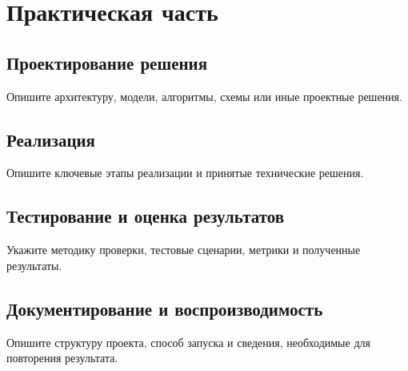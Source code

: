 \chapter{Практическая часть}

\section{Проектирование решения}
Опишите архитектуру, модели, алгоритмы, схемы или иные проектные решения.

\section{Реализация}
Опишите ключевые этапы реализации и принятые технические решения.

\section{Тестирование и оценка результатов}
Укажите методику проверки, тестовые сценарии, метрики и полученные результаты.

\section{Документирование и воспроизводимость}
Опишите структуру проекта, способ запуска и сведения, необходимые для повторения результата.

